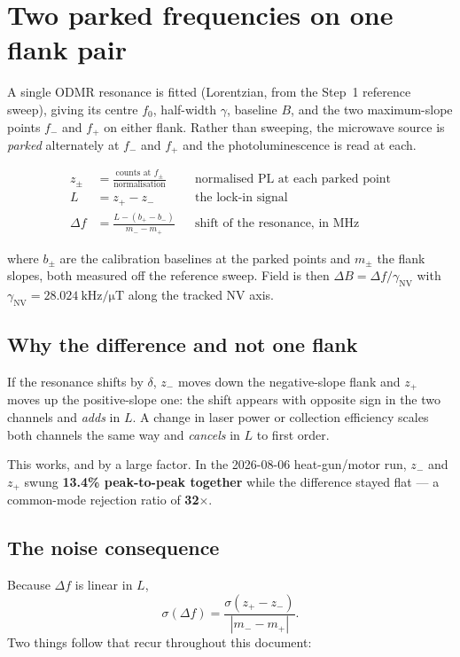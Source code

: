 \section{Two parked frequencies on one flank pair}

A single ODMR resonance is fitted (Lorentzian, from the Step~1 reference sweep),
giving its centre $f_0$, half-width $\gamma$, baseline $B$, and the two
maximum-slope points $f_-$ and $f_+$ on either flank. Rather than sweeping, the
microwave source is \emph{parked} alternately at $f_-$ and $f_+$ and the
photoluminescence is read at each.

\begin{align}
z_\pm &= \frac{\text{counts at } f_\pm}{\text{normalisation}}
   &&\text{normalised PL at each parked point} \\
L &= z_+ - z_-  &&\text{the lock-in signal} \\
\Delta f &= \frac{L - (b_+ - b_-)}{m_- - m_+}
   &&\text{shift of the resonance, in MHz}
\end{align}

where $b_\pm$ are the calibration baselines at the parked points and $m_\pm$ the
flank slopes, both measured off the reference sweep. Field is then
$\Delta B = \Delta f / \gamma_\text{NV}$ with
$\gamma_\text{NV} = \SI{28.024}{\kilo\hertz\per\micro\tesla}$ along the tracked
NV axis.

\subsection{Why the difference and not one flank}

If the resonance shifts by $\delta$, $z_-$ moves down the negative-slope flank
and $z_+$ moves up the positive-slope one: the shift appears with opposite sign
in the two channels and \emph{adds} in $L$. A change in laser power or collection
efficiency scales both channels the same way and \emph{cancels} in $L$ to first
order.

This works, and by a large factor. In the 2026-08-06 heat-gun/motor run, $z_-$
and $z_+$ swung \textbf{13.4\% peak-to-peak together} while the difference stayed
flat --- a common-mode rejection ratio of \textbf{32$\times$}.

\subsection{The noise consequence}

Because $\Delta f$ is linear in $L$,
\begin{equation}
\sigma(\Delta f) = \frac{\sigma(z_+ - z_-)}{|m_- - m_+|}.
\label{eq:noise}
\end{equation}
Two things follow that recur throughout this document:

